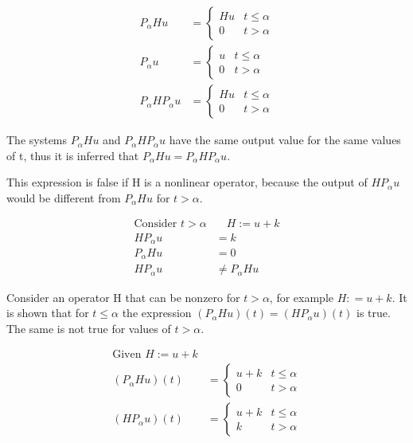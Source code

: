 \documentclass[a4paper,12pt]{article}
\begin{document}
\begin{enumerate}
\begin{align*}
 P_\alpha H u &= \begin{cases}
                  H u & t \leq \alpha \\
                  0 & t > \alpha
                 \end{cases}
                 \\
 P_\alpha u &= \begin{cases}
                  u & t \leq \alpha \\
                  0 & t > \alpha
                 \end{cases}
                 \\
 P_\alpha H P_\alpha u &= \begin{cases}
                  H u & t \leq \alpha \\
                  0 & t > \alpha
                 \end{cases}
\end{align*}

The systems $P_\alpha H u$  and $P_\alpha H P_\alpha u$ have the same output value for the same values of t, thus it is inferred that $P_\alpha H u  = P_\alpha H P_\alpha u$.

This expression is false if H is a nonlinear operator, because the output of $H P_\alpha u$ would be different from $P_\alpha H u$ for $t > \alpha$.

\begin{align*}
 \text{Consider } t > \alpha &  \quad H:= u + k\\
 H P_\alpha u &= k \\
 P_\alpha H u &= 0 \\
 H P_\alpha u &\neq P_\alpha H u
\end{align*}

Consider an operator H that can be nonzero for $t> \alpha$, for example $H: = u + k$.
It is shown that for $ t \leq \alpha$ the expression $(P_\alpha H u) (t) = (H P_\alpha u)(t)$ is true.
The same is not true for values of $t > \alpha$.

\begin{align*}
 \text{Given } H:= u + k & \\
 (P_\alpha H u) (t) &= \begin{cases}
                        u + k & t \leq \alpha \\
                        0 & t > \alpha
                       \end{cases}
\\
(H P_\alpha u)(t) &= \begin{cases}
                      u + k & t \leq \alpha \\
                      k & t > \alpha
                     \end{cases}
\end{align*}


\end{enumerate}
\end{document}
